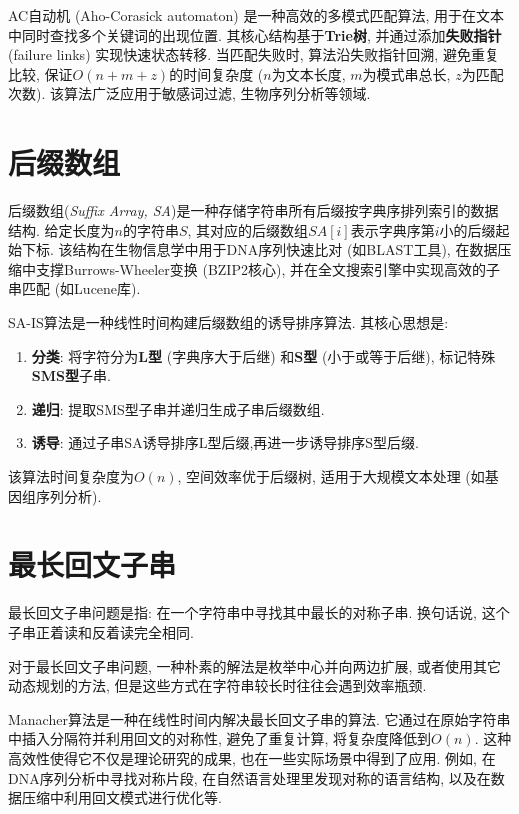 \documentclass[a4paper]{ctexbook}
\begin{document}
AC自动机 (Aho-Corasick automaton) 是一种高效的多模式匹配算法, 用于在文本中同时查找多个关键词的出现位置. 其核心结构基于\textbf{Trie树}, 并通过添加\textbf{失败指针} (failure links) 实现快速状态转移.
当匹配失败时, 算法沿失败指针回溯, 避免重复比较, 保证$O(n+m+z)$的时间复杂度 ($n$为文本长度, $m$为模式串总长, $z$为匹配次数). 该算法广泛应用于敏感词过滤, 生物序列分析等领域.



\section{后缀数组}

后缀数组(\textit{Suffix Array, SA})是一种存储字符串所有后缀按字典序排列索引的数据结构. 给定长度为$n$的字符串$S$, 其对应的后缀数组$SA[i]$表示字典序第$i$小的后缀起始下标. 该结构在生物信息学中用于DNA序列快速比对 (如BLAST工具), 在数据压缩中支撑Burrows-Wheeler变换 (BZIP2核心), 并在全文搜索引擎中实现高效的子串匹配 (如Lucene库).

SA-IS算法是一种线性时间构建后缀数组的诱导排序算法. 其核心思想是:
\begin{enumerate}
	\item \textbf{分类}: 将字符分为\textbf{L型} (字典序大于后继) 和\textbf{S型} (小于或等于后继), 标记特殊\textbf{SMS型}子串.
	\item \textbf{递归}: 提取SMS型子串并递归生成子串后缀数组.
	\item \textbf{诱导}: 通过子串SA诱导排序L型后缀,再进一步诱导排序S型后缀.
\end{enumerate}
该算法时间复杂度为$O(n)$, 空间效率优于后缀树, 适用于大规模文本处理 (如基因组序列分析).



\section{最长回文子串}

最长回文子串问题是指: 在一个字符串中寻找其中最长的对称子串. 换句话说, 这个子串正着读和反着读完全相同.

对于最长回文子串问题, 一种朴素的解法是枚举中心并向两边扩展, 或者使用其它动态规划的方法, 但是这些方式在字符串较长时往往会遇到效率瓶颈.

Manacher算法是一种在线性时间内解决最长回文子串的算法. 它通过在原始字符串中插入分隔符并利用回文的对称性, 避免了重复计算, 将复杂度降低到$O(n)$. 这种高效性使得它不仅是理论研究的成果, 也在一些实际场景中得到了应用. 例如, 在DNA序列分析中寻找对称片段, 在自然语言处理里发现对称的语言结构, 以及在数据压缩中利用回文模式进行优化等.
\end{document}
